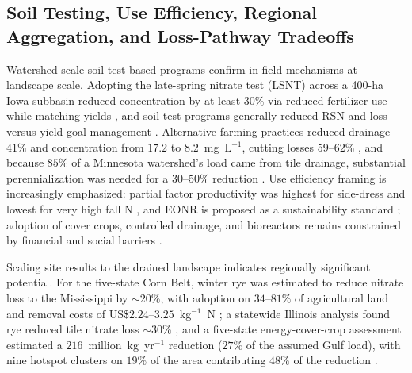 \subsection{Soil Testing, Use Efficiency, Regional Aggregation, and Loss-Pathway Tradeoffs}

Watershed-scale soil-test-based programs confirm in-field mechanisms at
landscape scale. Adopting the late-spring nitrate test (LSNT) across a 400-ha
Iowa subbasin reduced concentration by at least $30\%$ via reduced fertilizer
use while matching yields \parencite{Jaynes2004,Karlen2005,Malone2010}, and
soil-test programs generally reduced RSN and loss versus yield-goal management
\parencite{Dinnes2002,Ritter2015}. Alternative farming practices reduced
drainage $41\%$ and concentration from $17.2$ to $8.2$~mg~L$^{-1}$, cutting
losses $59$--$62\%$ \parencite{Oquist2007}, and because $85\%$ of a Minnesota
watershed's load came from tile drainage, substantial perennialization was
needed for a $30$--$50\%$ reduction \parencite{Wilson2023,Makhtoumi2025}. Use
efficiency framing is increasingly emphasized: partial factor productivity was
highest for side-dress and lowest for very high fall N \parencite{Jaynes2015},
and EONR is proposed as a sustainability standard \parencite{Bandura2025};
adoption of cover crops, controlled drainage, and bioreactors remains
constrained by financial and social barriers \parencite{David2015}.

Scaling site results to the drained landscape indicates regionally significant
potential. For the five-state Corn Belt, winter rye was estimated to reduce
nitrate loss to the Mississippi by $\sim20\%$, with adoption on
$34$--$81\%$ of agricultural land and removal costs of
US\$$2.24$--$3.25$~kg$^{-1}$~N \parencite{Kladivko2014}; a statewide Illinois
analysis found rye reduced tile nitrate loss $\sim30\%$
\parencite{Gupta2023b}, and a five-state energy-cover-crop assessment
estimated a $216$~million~kg~yr$^{-1}$ reduction ($27\%$ of the assumed Gulf
load), with nine hotspot clusters on $19\%$ of the area contributing $48\%$ of
the reduction \parencite{Malone2023}.

